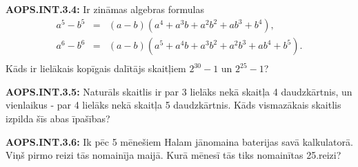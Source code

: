 \documentclass[11pt]{article}
\newenvironment{uzdevums}[1][\unskip]{%
\vspace{3mm}
\noindent
\textbf{#1:}
\noindent}
{}
\begin{document}
\begin{uzdevums}[AOPS.INT.3.4]
Ir zināmas algebras formulas
\[ \begin{array}{rcl}
a^5 - b^5 & = & (a-b) \left(a^4 + a^3b + a^2b^2 + ab^3 + b^4 \right), \\ 
a^6 - b^6 & = & (a-b) \left(a^5 + a^4b + a^3b^2 + a^2b^3 + ab^4 + b^5 \right). \\ 
\end{array} \]
Kāds ir lielākais kopīgais dalītājs skaitļiem $2^{30} - 1$ un $2^{25} - 1$? 
\end{uzdevums}

\begin{uzdevums}[AOPS.INT.3.5]
Naturāls skaitlis ir par 3 lielāks nekā skaitļa 4 daudzkārtnis, un vienlaikus - par 4 lielāks nekā skaitļa 5 daudzkārtnis. 
Kāds vismazākais skaitlis izpilda šīs abas īpašības?
\end{uzdevums}

\begin{uzdevums}[AOPS.INT.3.6]
Ik pēc 5 mēnešiem Halam jānomaina baterijas savā kalkulatorā. Viņš pirmo reizi tās nomainīja maijā. Kurā mēnesī tās tiks nomainītas 25.reizi?
\end{uzdevums}
\end{document}
